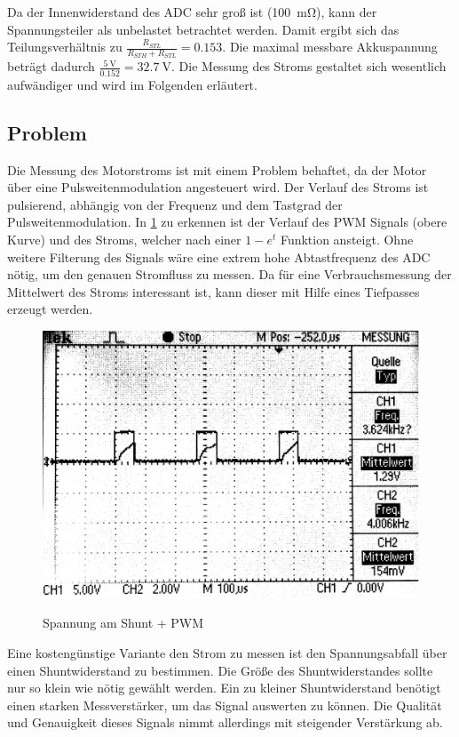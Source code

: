 Da der Innenwiderstand des ADC sehr groß ist (\SI{100}{\milli\ohm}), kann der Spannungsteiler als unbelastet betrachtet werden. Damit ergibt sich das Teilungsverhältnis zu $\frac{R_{STL}}{R_{STH}+R_{STL}}=\num{0,153}$.
Die maximal messbare Akkuspannung beträgt dadurch $\frac{\SI{5}{\volt}}{\num{0,152}}=\SI{32,7}{\volt}$. Die Messung des Stroms gestaltet sich wesentlich aufwändiger und wird im Folgenden erläutert.




\subsection{Problem}

Die Messung des Motorstroms ist mit einem Problem behaftet, da der Motor über eine Pulsweitenmodulation angesteuert wird. Der Verlauf des Stroms ist pulsierend, abhängig von
der Frequenz und dem Tastgrad der Pulsweitenmodulation. In \cref{fig:pwm+i_0} zu erkennen ist der Verlauf des PWM Signals (obere Kurve) und des Stroms, welcher nach einer $1-e^t$ Funktion ansteigt.
Ohne weitere Filterung des Signals wäre eine extrem hohe Abtastfrequenz des ADC nötig, um den genauen Stromfluss zu messen. Da für eine Verbrauchsmessung 
der Mittelwert des Stroms interessant ist, kann dieser mit Hilfe eines Tiefpasses erzeugt werden.


\begin{figure}[H]
\centering
\includegraphics[width=.8\textwidth]{oszi.png}\\
\caption{Spannung am Shunt + PWM}%
\label{fig:pwm+i_0}
\end{figure}

Eine kostengünstige Variante den Strom zu messen ist den Spannungsabfall über einen Shuntwiderstand zu bestimmen. Die Größe des Shuntwiderstandes sollte nur so klein wie nötig gewählt werden.
Ein zu kleiner Shuntwiderstand benötigt einen starken Messverstärker, um das Signal auswerten zu können. Die Qualität und Genauigkeit dieses Signals nimmt allerdings mit steigender Verstärkung ab.

